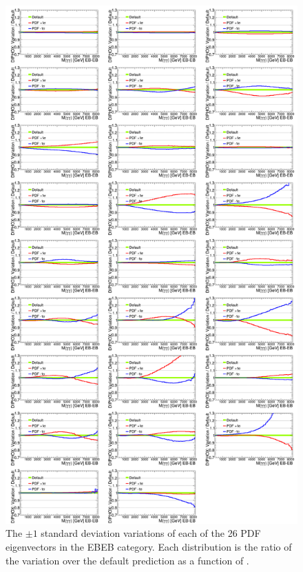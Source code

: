 \begin{figure}[!htbp]
	\centering
	\includegraphics[scale=0.20]{figures/SYS_PDF_EB.pdf}
	\caption{The $\pm1$ standard deviation variations of each of the 26 PDF eigenvectors in the EBEB category. Each distribution is the ratio of the variation over the default prediction as a function of \mgg.}
	\label{fig:sys_PDF_EB}
\end{figure}

